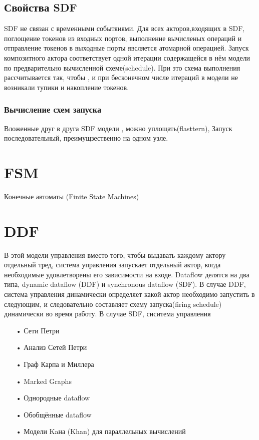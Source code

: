 \documentclass[a4paper,14pt]{article}
\begin{document}
\subsection{Свойства SDF}
\par SDF не связан с временными событяиями. Для всех акторов,входящих в SDF,  поглощение токенов из входных портов, выполнение вычисленых операций и отправление токенов в выходные порты явсляется атомарной операцией. Запуск композитного актора соответствует одной итерации содержащейся в нём модели по предварительно вычисленной схеме(schedule). При это схема выполнения рассчитывается так, чтобы , и при бесконечном числе итераций в модели не возникали тупики и накопление токенов. 
\subsubsection{Вычисление схем запуска}
Вложенные друг в друга SDF модели , можно уплощать(flasttern),
Запуск последовательный, преимущзественно на одном узле.

\section*{FSM}
Конечные автоматы (Finite State Machines) 
\section*{DDF}


В этой модели управления вместо того, чтобы выдавать каждому актору отдельный тред, система управления запускает отдельный актор, когда необходимые удовлетворены его зависимости на входе.  Dataflow делятся на два типа, dynamic dataflow (DDF) и synchronous dataflow (SDF). В случае DDF, система управления динамически определяет  какой актор необходимо запустить в следующим, и следовательно составляет схему запуска(firing schedule) динамически во время работу. В случае SDF, сиситема управления 
\begin{enumerate}
\item[•] Сети Петри
\item[•] Анализ Сетей Петри
\item[•] Граф Карпа и Миллера 
\item[•] Marked Graphs
\item[•] Однородные dataflow
\item[•] Обобщённые dataflow
\item[•] Модели Kaна (Khan) для параллельных вычислений
\end{enumerate}
\end{document}
